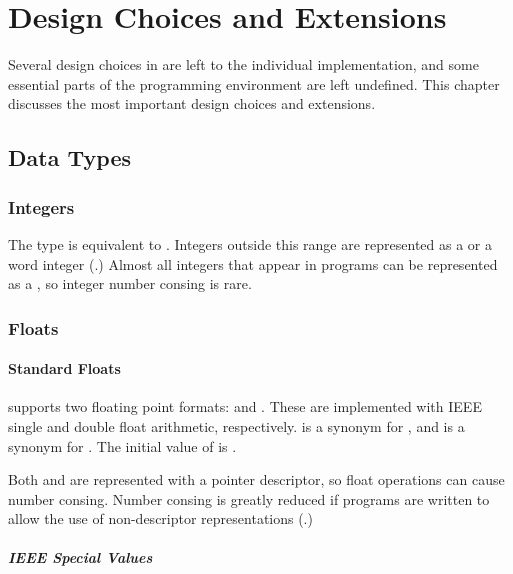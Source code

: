 \chapter{Design Choices and Extensions}

Several design choices in \clisp{} are left to the individual
implementation, and some essential parts of the programming environment
are left undefined.  This chapter discusses the most important design
choices and extensions.

\section{Data Types}

\subsection{Integers}

The  type is equivalent to .
Integers outside this range are represented as a  or
a word integer (.)  Almost all integers that
appear in programs can be represented as a , so integer
number consing is rare.


\subsection{Floats}
\subsubsection{Standard Floats}
\label{ieee-float}

\cmucl{} supports two floating point formats: 
and .  These are implemented with IEEE single
and double float arithmetic, respectively.   is a
synonym for , and  is a synonym
for .  The initial value of
 is .

Both  and  are represented with
a pointer descriptor, so float operations can cause number consing.
Number consing is greatly reduced if programs are written to allow the
use of non-descriptor representations (.)


\paragraph{IEEE Special Values}

